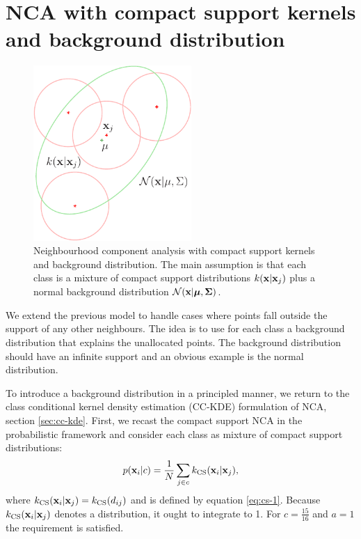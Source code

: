 	
\section{NCA with compact support kernels and background distribution}
\label{sec:nca-cs-back}

	\begin{figure}
	  \centering\includegraphics[width=6cm]{images/nca-cs-back}
	  \caption{Neighbourhood component analysis with compact support kernels and
	background distribution. The main assumption is that each class is a mixture of
	compact support distributions $k(\mathbf{x}|\mathbf{x}_j)$ plus a normal background
	distribution $\mathcal{N}(\mathbf{x}|\mbox{\boldmath $\mu$},\mbox{\boldmath $\Sigma$})$.}
	  \label{fig:cs-back}
	\end{figure}
	
	We extend the previous model to handle cases where points fall outside the support of any other neighbours. The idea is to use  for each class a background distribution that explains the unallocated points. The background distribution should have an infinite support and an obvious example is the normal distribution.
	
	To introduce a background distribution in a principled manner, we return to the class conditional kernel density estimation (CC-KDE) formulation of NCA, section \ref{sec:cc-kde}. First, we recast the compact support NCA in the probabilistic framework and consider each class as mixture of compact support distributions: 
	\begin{align}
		p(\mathbf{x}_i|c) = \frac{1}{N}\sum_{j\in c} k_\text{CS}(\mathbf{x}_i|\mathbf{x}_j),
	\end{align}
	where $k_\text{CS}(\mathbf{x}_i|\mathbf{x}_j) = k_\text{CS}(d_{ij})$ and is defined by equation \eqref{eq:cs-1}. Because $k_\text{CS}(\mathbf{x}_i|\mathbf{x}_j)$ denotes a distribution, it ought to integrate to 1. For $c=\frac{15}{16}$ and $a=1$ the requirement is satisfied.
	
